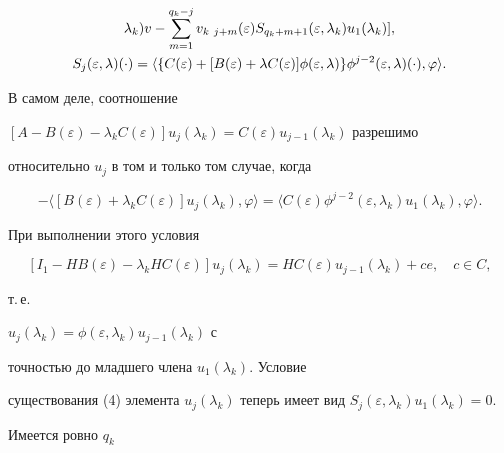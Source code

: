 \begin{thm}
\begin{gather}
\lambda_k)v-\sum_{m=1}^{q_k-j}v_{k \ j+m}(\varepsilon)


S_{q_k+m+1}(\varepsilon, \lambda_k)u_1(\lambda_k)],\\


%


S_j(\varepsilon,


\lambda)(\cdot)=\langle\{C(\varepsilon)+[B(\varepsilon)+\lambda C(


\varepsilon)]\phi(\varepsilon,\lambda)\}\phi^{j-2}(\varepsilon,\lambda)


(\cdot),\varphi\rangle.\notag


\end{gather}


\end{thm}





В самом деле, соотношение


$[A-B(\varepsilon)-\lambda_kC(\varepsilon)]u_j(\lambda_k)=


C(\varepsilon)u_{j-1}(\lambda_k) $ разрешимо


относительно $u_j$ в том и только том случае, когда


\begin{equation}


-\langle[B(\varepsilon)+\lambda_kC(\varepsilon)]u_j(\lambda_k),


\varphi\rangle=\langle C(


\varepsilon)\phi^{j-2}(\varepsilon,\lambda_k)u_1(\lambda_k),\varphi\rangle.


\end{equation}


При выполнении этого условия


$$


[I_1-HB(\varepsilon)-\lambda_kHC(\varepsilon)]u_j(\lambda_k)=HC(\varepsilon)


u_{j-1}(\lambda_k)+ce,\quad c\in C,


$$


т.\,е.


$u_j(\lambda_k)=\phi(\varepsilon, \lambda_k)u_{j-1}(\lambda_k)$ с


точностью до младшего члена $u_1(\lambda_k)$. Условие


существования (4) элемента $u_j(\lambda_k)$ теперь имеет вид $S_j(


\varepsilon,\lambda_k)u_1(\lambda_k)=0$.


Имеется ровно $q_k$


